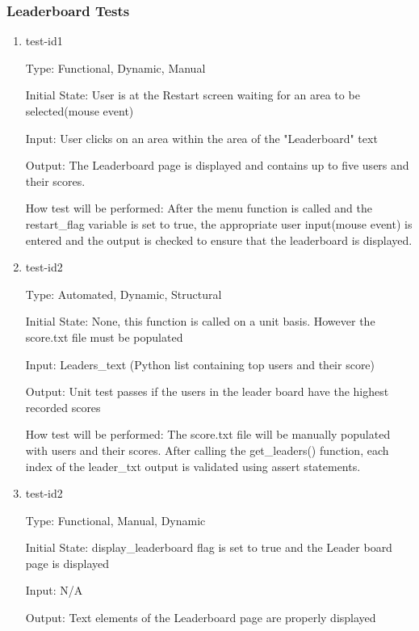 \documentclass[12pt, titlepage]{article}
\begin{document}
	
	\subsubsection{Leaderboard Tests}
	
	\begin{enumerate}
		
		\item{test-id1\\}
		
		Type: Functional, Dynamic, Manual
		
		Initial State: User is at the Restart screen waiting for an area to be selected(mouse event)
		
		Input: User clicks on an area within the area of the "Leaderboard" text
		
		Output: The Leaderboard page is displayed and contains up to five users and their scores.
		
		How test will be performed: After the menu function is called and the restart\_flag variable is set to true, the appropriate user input(mouse event) is entered and the output is checked to ensure that the leaderboard is displayed. 
		
		\item{test-id2\\}
		
		Type: Automated, Dynamic, Structural
		
		Initial State: None, this function is called on a unit basis. However the score.txt file must be populated
		
		Input: Leaders\_text (Python list containing top users and their score)
		
		Output: Unit test passes if the users in the leader board have the highest recorded scores
		
		How test will be performed: The score.txt file will be manually populated with users and their scores.
		After calling the get\_leaders() function, each index of the leader\_txt output is validated using assert statements.
		
		\item{test-id2\\}
		
		Type: Functional, Manual, Dynamic 
		
		Initial State: display\_leaderboard flag is set to true and the Leader board page is displayed
		
		Input: N/A
		
		Output: Text elements of the Leaderboard page are properly displayed
		

\end{enumerate}
\end{document}
